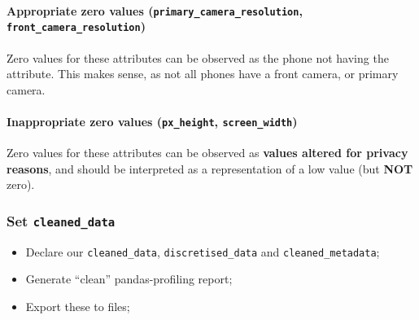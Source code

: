 \documentclass[11pt]{article}
\providecommand{\tightlist}{%
      \setlength{\itemsep}{0pt}\setlength{\parskip}{0pt}}
\begin{document}
\hypertarget{appropriate-zero-values-primary_camera_resolution-front_camera_resolution}{%
\paragraph{\texorpdfstring{\textbf{Appropriate zero values}
(\texttt{primary\_camera\_resolution},
\texttt{front\_camera\_resolution})}{Appropriate zero values (primary\_camera\_resolution, front\_camera\_resolution)}}\label{appropriate-zero-values-primary_camera_resolution-front_camera_resolution}}

Zero values for these attributes can be observed as the phone not having
the attribute. This makes sense, as not all phones have a front camera,
or primary camera.

\hypertarget{inappropriate-zero-values-px_height-screen_width}{%
\paragraph{\texorpdfstring{Inappropriate zero values
(\texttt{px\_height},
\texttt{screen\_width})}{Inappropriate zero values (px\_height, screen\_width)}}\label{inappropriate-zero-values-px_height-screen_width}}

Zero values for these attributes can be observed as \textbf{values
altered for privacy reasons}, and should be interpreted as a
representation of a low value (but \textbf{NOT} zero).

    \hypertarget{set-cleaned_data}{%
\subsubsection{\texorpdfstring{Set
\texttt{cleaned\_data}}{Set cleaned\_data}}\label{set-cleaned_data}}

\begin{itemize}
\tightlist
\item
  Declare our \texttt{cleaned\_data}, \texttt{discretised\_data} and
  \texttt{cleaned\_metadata};
\item
  Generate ``clean'' pandas-profiling report;
\item
  Export these to files;
\end{itemize}
\end{document}
